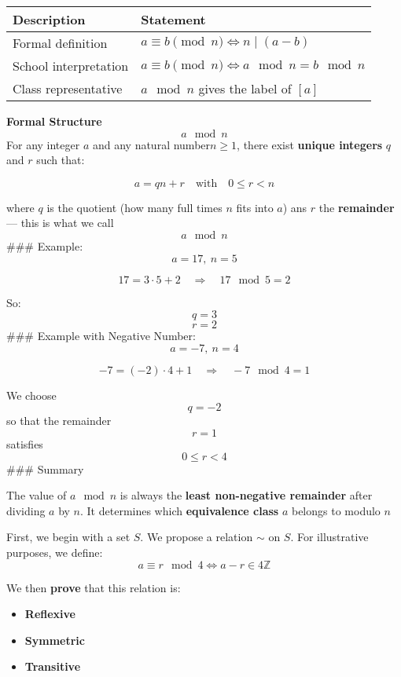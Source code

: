 \documentclass[
]{article}
\providecommand{\tightlist}{%
  \setlength{\itemsep}{0pt}\setlength{\parskip}{0pt}}
\begin{document}
\begin{longtable}[]{@{}
  >{\raggedright\arraybackslash}p{}
  >{\raggedright\arraybackslash}p{}@{}}
\toprule\noalign{}
\begin{minipage}[b]{\linewidth}\raggedright
Description
\end{minipage} & \begin{minipage}[b]{\linewidth}\raggedright
Statement
\end{minipage} \\
\midrule\noalign{}
\endhead
\bottomrule\noalign{}
\endlastfoot
Formal definition & \(a \equiv b \pmod{n} \iff n \mid (a - b)\) \\
School interpretation &
\(a \equiv b \pmod{n} \iff a \mod n = b \mod n\) \\
Class representative & \(a \mod n\) gives the label of \([a]\) \\
\end{longtable}

\textbf{Formal Structure} \[a \mod n\] For any integer \(a\) and any
natural number\(n \geq 1\), there exist \textbf{unique integers} \(q\)
and \(r\) such that:

\[ a = qn + r \quad \text{with} \quad 0 \leq r < n\]

where \(q\) is the quotient (how many full times \(n\) fits into \(a\))
ans \(r\) the \textbf{remainder} --- this is what we call \[a \mod n\]
\#\#\# Example: \[a = 17, \ n = 5\]

\[
17 = 3 \cdot 5 + 2 \quad \Rightarrow \quad 17 \mod 5 = 2
\]

So: \[q = 3\] \[r = 2\] \#\#\# Example with Negative Number:
\[a = -7, \ n = 4\]

\[
-7 = (-2) \cdot 4 + 1 \quad \Rightarrow \quad -7 \mod 4 = 1
\]

We choose \[q = -2\] so that the remainder \[r = 1\] satisfies
\[0 \leq r < 4\] \#\#\# Summary

The value of \(a \mod n\) is always the \textbf{least non-negative
remainder} after dividing \(a\) by \(n\). It determines which
\textbf{equivalence class} \(a\) belongs to modulo \(n\)

First, we begin with a set \(S\). We propose a relation \(\sim\) on
\(S\). For illustrative purposes, we define: \[
a \equiv r \mod 4 \iff a - r \in 4\mathbb{Z}
\]

We then \textbf{prove} that this relation is:

\begin{itemize}
\tightlist
\item
  \textbf{Reflexive}
\item
  \textbf{Symmetric}
\item
  \textbf{Transitive}
\end{itemize}
\end{document}
